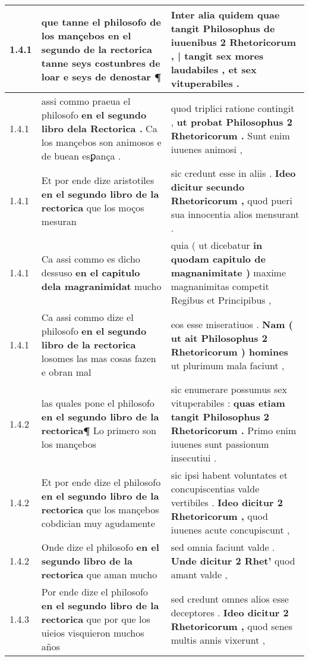 \begin{tabular}{|p{1cm}|p{6.5cm}|p{6.5cm}|}
1.4.1 & que tanne el philosofo de los mançebos \textbf{ en el segundo de la rectorica tanne seys costunbres de loar } e seys de denostar ¶ & Inter alia quidem quae tangit Philosophus \textbf{ de iuuenibus 2 Rhetoricorum , | tangit sex mores laudabiles , } et sex vituperabiles . \\\hline
1.4.1 & assi commo praeua el philosofo \textbf{ en el segundo libro dela Rectorica . } Ca los mançebos son animosos e de buean esꝑança . & quod triplici ratione contingit , \textbf{ ut probat Philosophus 2 Rhetoricorum . } Sunt enim iuuenes animosi , \\\hline
1.4.1 & Et por ende dize aristotiles \textbf{ en el segundo libro de la rectorica } que los moços mesuran & sic credunt esse in aliis . \textbf{ Ideo dicitur secundo Rhetoricorum , } quod pueri sua innocentia alios mensurant . \\\hline
1.4.1 & Ca assi commo es dicho dessuso \textbf{ en el capitulo dela magranimidat } mucho & quia ( ut dicebatur \textbf{ in quodam capitulo de magnanimitate ) } maxime magnanimitas competit Regibus et Principibus , \\\hline
1.4.1 & Ca assi commo dize el philosofo \textbf{ en el segundo libro de la rectorica } losomes las mas cosas fazen e obran mal & eos esse miseratiuos . \textbf{ Nam ( ut ait Philosophus 2 Rhetoricorum ) homines } ut plurimum mala faciunt , \\\hline
1.4.2 & las quales pone el philosofo \textbf{ en el segundo libro de la rectorica¶ } Lo primero son los mançebos & sic enumerare possumus sex vituperabiles : \textbf{ quas etiam tangit Philosophus 2 Rhetoricorum . } Primo enim iuuenes sunt passionum insecutiui . \\\hline
1.4.2 & Et por ende dize el philosofo \textbf{ en el segundo libro de la rectorica } que los mançebos cobdician muy agudamente & sic ipsi habent voluntates et concupiscentias valde vertibiles . \textbf{ Ideo dicitur 2 Rhetoricorum , } quod iuuenes acute concupiscunt , \\\hline
1.4.2 & Onde dize el philosofo \textbf{ en el segundo libro de la rectorica } que aman mucho & sed omnia faciunt valde . \textbf{ Unde dicitur 2 Rhet’ } quod amant valde , \\\hline
1.4.3 & Por ende dize el philosofo \textbf{ en el segundo libro de la rectorica } que por que los uieios visquieron muchos años & sed credunt omnes alios esse deceptores . \textbf{ Ideo dicitur 2 Rhetoricorum , } quod senes multis annis vixerunt , \\\hline

\end{tabular}
